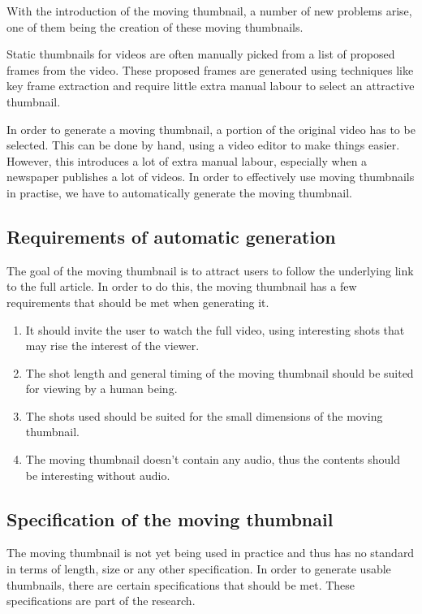 \documentclass{../resources/acm_proc_article-sp}
\begin{document}
With the introduction of the moving thumbnail, a number of new problems arise, one of them being the creation of these moving thumbnails.

Static thumbnails for videos are often manually picked from a list of proposed frames from the video. These proposed frames are generated using techniques like key frame extraction \cite{Dirfaux:2000iu} and require little extra manual labour to select an attractive thumbnail.

In order to generate a moving thumbnail, a portion of the original video has to be selected. This can be done by hand, using a video editor to make things easier. However, this introduces a lot of extra manual labour, especially when a newspaper publishes a lot of videos. In order to effectively use moving thumbnails in practise, we have to automatically generate the moving thumbnail.

\subsection{Requirements of automatic generation}
\label{sec: requirements of automatic generation}

The goal of the moving thumbnail is to attract users to follow the underlying link to the full article. In order to do this, the moving thumbnail has a few requirements that should be met when generating it.

\begin{enumerate}
  \item It should invite the user to watch the full video, using interesting shots that may rise the interest of the viewer.
  \item The shot length and general timing of the moving thumbnail should be suited for viewing by a human being.
  \item The shots used should be suited for the small dimensions of the moving thumbnail.
  \item The moving thumbnail doesn't contain any audio, thus the contents should be interesting without audio.
\end{enumerate}

\subsection{Specification of the moving thumbnail}

The moving thumbnail is not yet being used in practice and thus has no standard in terms of length, size or any other specification. In order to generate usable thumbnails, there are certain specifications that should be met. These specifications are part of the research.
\end{document}
